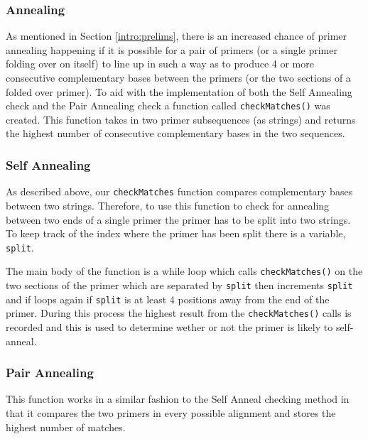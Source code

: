 \subsubsection{Annealing}

As mentioned in Section \ref{intro:prelims}, there is an increased
chance of primer annealing happening if it is possible for a pair of
primers (or a single primer folding over on itself) to line up in such a
way as to produce 4 or more consecutive complementary bases between the
primers (or the two sections of a folded over primer). To aid with the
implementation of both the Self Annealing check and the Pair Annealing
check a function called \texttt{checkMatches()} was created. This function
takes in two primer subsequences (as strings) and returns the highest 
number of consecutive complementary bases in the two sequences.

\subsubsection{Self Annealing}

As described above, our \texttt{checkMatches} function compares
complementary bases between two strings. Therefore, to use this function
to check for annealing between two ends of a single primer the primer
has to be split into two strings. To keep track of the index where the
primer has been split there is a variable, \texttt{split}.

The main body of the function is a while loop which calls
\texttt{checkMatches()} on the two sections of the primer which are
separated by \texttt{split} then increments \texttt{split} and if loops
again if \texttt{split} is at least 4 positions away from the end of the
primer. During this process the highest result from the
\texttt{checkMatches()} calls is recorded and this is used to determine
wether or not the primer is likely to self-anneal.

\subsubsection{Pair Annealing}

This function works in a similar fashion to the Self Anneal checking
method in that it compares the two primers in every possible alignment
and stores the highest number of matches.

